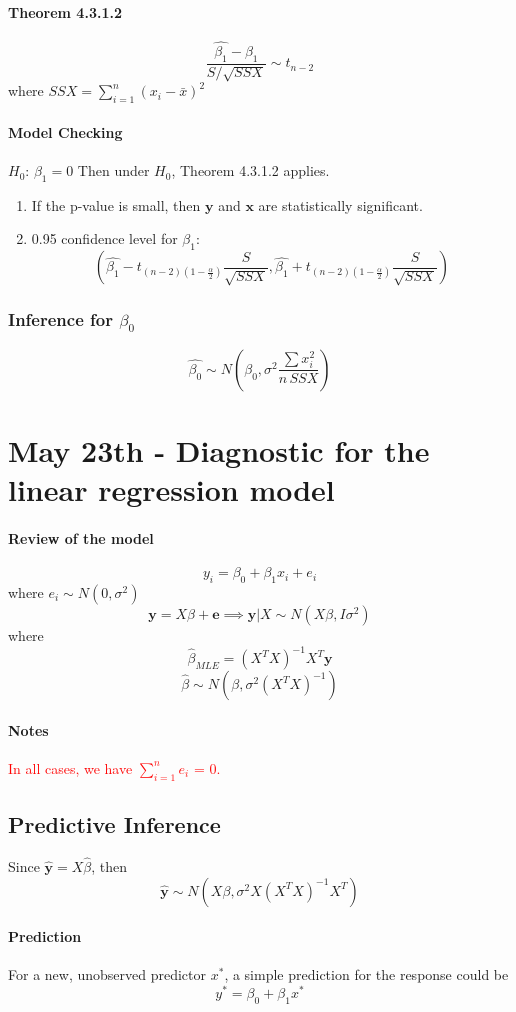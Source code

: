 \documentclass[11pt]{article}
\newcommand{\tb}[1]{\textbf{#1}}
\newcommand{\vx}[0]{\tb{x}}
\newcommand{\vy}[0]{\tb{y}}
\newcommand{\ve}[0]{\tb{e}}
\begin{document}
\paragraph{Theorem 4.3.1.2}
$$\frac{\hat{\beta_1} - \beta_1}{S/\sqrt{SSX}} \sim t_{n-2}$$
where $SSX = \sum_{i=1}^n(x_i - \bar{x})^2$
\paragraph{Model Checking}
$H_0$: $\beta_1 = 0$
Then under $H_0$, Theorem 4.3.1.2 applies. 
\begin{enumerate}
    \item If the p-value is small, then $\vy$ and $\vx$ are statistically significant.
    \item 0.95 confidence level for $\beta_1$:
    $$(\hat{\beta_1} - t_{(n-2)(1-\frac{\alpha}{2})}\frac{S}{\sqrt{SSX}}, \hat{\beta_1} + t_{(n-2)(1-\frac{\alpha}{2})}\frac{S}{\sqrt{SSX}})$$
\end{enumerate}
\subsubsection{Inference for $\beta_0$}
$$\hat{\beta_0} \sim N(\beta_0, \sigma^2\frac{\sum x_i^2}{n\,SSX})$$

\section{May 23th - Diagnostic for the linear regression model}
\paragraph{Review of the model}
$$y_i = \beta_0 + \beta_1 x_i + e_i$$ where $e_i \sim N(0, \sigma^2)$
$$\vy = X\beta + \ve \implies \vy|X \sim N(X\beta, I\sigma^2)$$
where $$\hat{\beta}_{MLE} = (X^TX)^{-1}X^T\vy$$
$$\hat{\beta} \sim N(\beta, \sigma^2(X^TX)^{-1})$$
\paragraph{Notes}
\textcolor{red}{In all cases, we have $\sum_{i=1}^n e_i$ = 0.}

\subsection{Predictive Inference}
Since $\hat{\vy} = X\hat{\beta}$, then
$$\hat{\vy} \sim N(X\beta, \sigma^2X(X^TX)^{-1}X^T)$$
\paragraph{Prediction}
For a new, unobserved predictor $x^*$, a simple prediction for the response could be $$y^* = \beta_0 + \beta_1x^*$$
\end{document}
